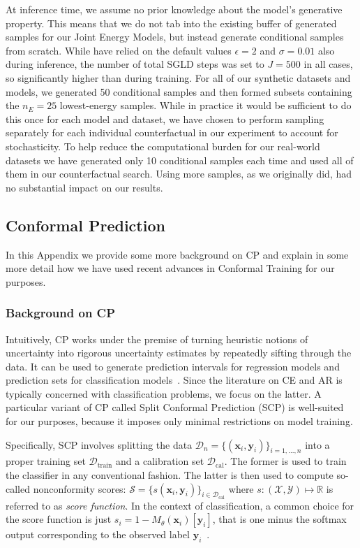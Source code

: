 \documentclass{article}
\begin{document}
At inference time, we assume no prior knowledge about the model's generative property. This means that we do not tab into the existing buffer of generated samples for our Joint Energy Models, but instead generate conditional samples from scratch. While have relied on the default values $\epsilon=2$ and $\sigma=0.01$ also during inference, the number of total SGLD steps was set to $J=500$ in all cases, so significantly higher than during training. For all of our synthetic datasets and models, we generated 50 conditional samples and then formed subsets containing the $n_{E}=25$ lowest-energy samples. While in practice it would be sufficient to do this once for each model and dataset, we have chosen to perform sampling separately for each individual counterfactual in our experiment to account for stochasticity. To help reduce the computational burden for our real-world datasets we have generated only 10 conditional samples each time and used all of them in our counterfactual search. Using more samples, as we originally did, had no substantial impact on our results.

\subsection{Conformal Prediction}\label{app:cp}

In this Appendix we provide some more background on CP and explain in some more detail how we have used recent advances in Conformal Training for our purposes.

\subsubsection{Background on CP}

Intuitively, CP works under the premise of turning heuristic notions of uncertainty into rigorous uncertainty estimates by repeatedly sifting through the data. It can be used to generate prediction intervals for regression models and prediction sets for classification models~\citep{altmeyer2022conformal}. Since the literature on CE and AR is typically concerned with classification problems, we focus on the latter. A particular variant of CP called Split Conformal Prediction (SCP) is well-suited for our purposes, because it imposes only minimal restrictions on model training. 

Specifically, SCP involves splitting the data $\mathcal{D}_n=\{(\mathbf{x}_i,\mathbf{y}_i)\}_{i=1,...,n}$ into a proper training set $\mathcal{D}_{\text{train}}$ and a calibration set $\mathcal{D}_{\text{cal}}$. The former is used to train the classifier in any conventional fashion. The latter is then used to compute so-called nonconformity scores: $\mathcal{S}=\{s(\mathbf{x}_i,\mathbf{y}_i)\}_{i \in \mathcal{D}_{\text{cal}}}$ where $s: (\mathcal{X},\mathcal{Y}) \mapsto \mathbb{R}$ is referred to as \textit{score function}. In the context of classification, a common choice for the score function is just $s_i=1-M_{\theta}(\mathbf{x}_i)[\mathbf{y}_i]$, that is one minus the softmax output corresponding to the observed label $\mathbf{y}_i$~\citep{angelopoulos2021gentle}. 
\end{document}

